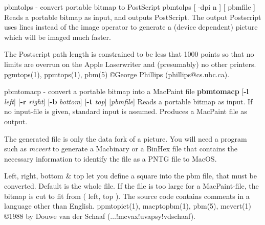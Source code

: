 \newpage
%

pbmtolps - convert portable bitmap to PostScript
pbmtolps [ -dpi n ] [ pbmfile ]
Reads a portable bitmap as input, and outputs PostScript.
The output Postscript uses lines instead of the image operator to
generate a (device dependent) picture which will be imaged
much faster.
\par
The Postscript path length is constrained to be less that 1000
points so that no limits are overrun on the Apple Laserwriter
and (presumably) no other printers.
pgmtops(1), ppmtops(1), pbm(5)
\copyright George Phillips (phillips@cs.ubc.ca).
%
 
%

\newpage
%

pbmtomacp - convert a portable bitmap into a MacPaint file
{\bf pbmtomacp}
{\rm [}{\bf -l}
{\it left}{\rm ]}
{\rm [}{\bf -r}
{\it right}{\rm ]}
{\rm [}{\bf -b}
{\it bottom}{\rm ]}
{\rm [}{\bf -t}
{\it top}{\rm ]}
{\rm [}{\it pbmfile}{\rm ]}
Reads a portable bitmap as input.
If no input-file is given, standard input is assumed.
Produces a MacPaint file as output.
\par
The generated file is only the data fork of a picture.
You will need a program such as
{\it mcvert}
to generate a Macbinary or a BinHex file that contains the necessary
information to identify the file as a PNTG file to MacOS.
\par
Left, right, bottom \& top let you define a square into the pbm file,
that must be converted.
Default is the whole file.
If the file is too large for a MacPaint-file, the bitmap is cut to fit
from ( left, top ).
The source code contains comments in a language other than English.
ppmtopict(1), macptopbm(1), pbm(5), mcvert(1)
\copyright 1988 by Douwe van der Schaaf ($\ldots$!mcvax!uvapsy!vdschaaf).
%
 
